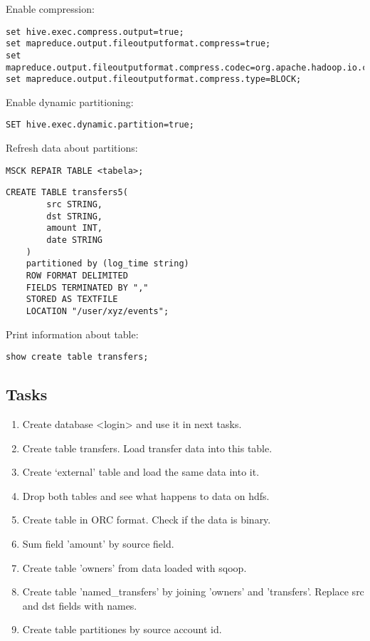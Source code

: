 \documentclass{article}
\begin{document}
Enable compression:
\begin{lstlisting}
set hive.exec.compress.output=true;
set mapreduce.output.fileoutputformat.compress=true;
set mapreduce.output.fileoutputformat.compress.codec=org.apache.hadoop.io.compress.GzipCodec;
set mapreduce.output.fileoutputformat.compress.type=BLOCK;
\end{lstlisting}

Enable dynamic partitioning:
\begin{lstlisting}
SET hive.exec.dynamic.partition=true;
\end{lstlisting}

\pagebreak

Refresh data about partitions:
\begin{lstlisting}
MSCK REPAIR TABLE <tabela>;
\end{lstlisting}

\begin{lstlisting}
CREATE TABLE transfers5(
		src STRING,
		dst STRING,
		amount INT,
		date STRING
	)
	partitioned by (log_time string)
	ROW FORMAT DELIMITED
	FIELDS TERMINATED BY ","
	STORED AS TEXTFILE
	LOCATION "/user/xyz/events";
\end{lstlisting}

Print information about table:
\begin{lstlisting}
show create table transfers;
\end{lstlisting}

\subsection*{Tasks}

\begin{enumerate}
\item Create database <login> and use it in next tasks.
\item Create table transfers. Load transfer data into this table.
\item Create ‘external’ table and load the same data into it.
\item Drop both tables and see what happens to data on hdfs.
\item Create table in ORC format. Check if the data is binary.
\item Sum field 'amount' by source field.
\item Create table 'owners' from data loaded with sqoop.
\item Create table 'named\_transfers' by joining 'owners' and 'transfers'. Replace src and dst fields with names.
\item Create table partitiones by source account id.
\end{enumerate}
\end{document}
